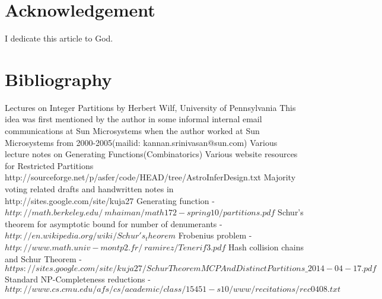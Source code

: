 \documentclass[11pt,onecolumn]{article}
\begin{document}
\section{Acknowledgement}
I dedicate this article to God.

\section{Bibliography}
\begin{thebibliography}{99}
 Lectures on Integer Partitions by Herbert Wilf, University of Pennsylvania
 This idea was first mentioned by the author in some informal internal email communications at Sun Microsystems when the author worked at Sun Microsystems from 2000-2005(mailid: kannan.srinivasan@sun.com)
 Various lecture notes on Generating Functions(Combinatorics)
 Various website resources for Restricted Partitions
 http://sourceforge.net/p/asfer/code/HEAD/tree/AstroInferDesign.txt
 Majority voting related drafts and handwritten notes in http://sites.google.com/site/kuja27
 Generating function - $http://math.berkeley.edu/~mhaiman/math172-spring10/partitions.pdf$
 Schur's theorem for asymptotic bound for number of denumerants - $http://en.wikipedia.org/wiki/Schur's_theorem$
 Frobenius problem - $http://www.math.univ-montp2.fr/~ramirez/Tenerif3.pdf$
 Hash collision chains and Schur Theorem - $https://sites.google.com/site/kuja27/SchurTheoremMCPAndDistinctPartitions\_2014-04-17.pdf$
 Standard NP-Completeness reductions - $http://www.cs.cmu.edu/afs/cs/academic/class/15451-s10/www/recitations/rec0408.txt$
\end{thebibliography}
\end{document}
